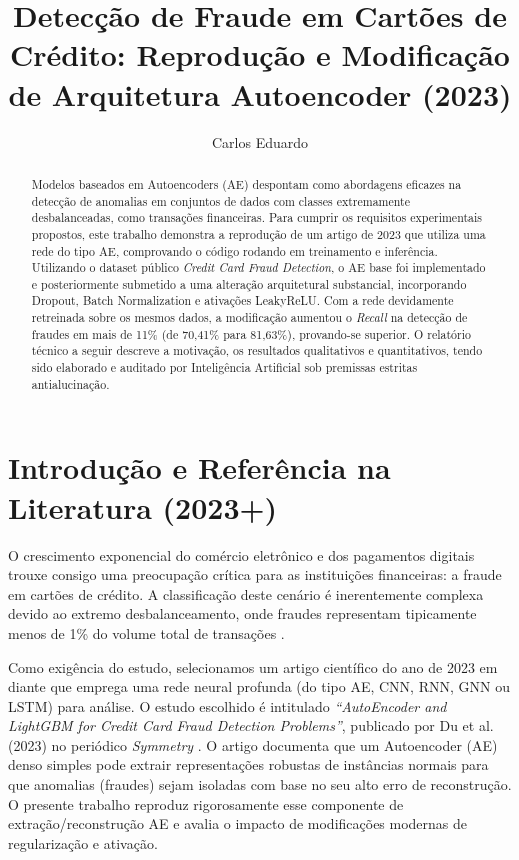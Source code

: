 \documentclass[runningheads]{template_llncs/llncs}
\begin{document}
%
\title{Detecção de Fraude em Cartões de Crédito: Reprodução e Modificação de Arquitetura Autoencoder (2023)}
%
%
\author{Carlos Eduardo}
%
%
%
\maketitle              %
%
\begin{abstract}
Modelos baseados em Autoencoders (AE) despontam como abordagens eficazes na detecção de anomalias em conjuntos de dados com classes extremamente desbalanceadas, como transações financeiras. Para cumprir os requisitos experimentais propostos, este trabalho demonstra a reprodução de um artigo de 2023 que utiliza uma rede do tipo AE, comprovando o código rodando em treinamento e inferência. Utilizando o dataset público \emph{Credit Card Fraud Detection}, o AE base foi implementado e posteriormente submetido a uma alteração arquitetural substancial, incorporando Dropout, Batch Normalization e ativações LeakyReLU. Com a rede devidamente retreinada sobre os mesmos dados, a modificação aumentou o \emph{Recall} na detecção de fraudes em mais de 11\% (de 70,41\% para 81,63\%), provando-se superior. O relatório técnico a seguir descreve a motivação, os resultados qualitativos e quantitativos, tendo sido elaborado e auditado por Inteligência Artificial sob premissas estritas antialucinação.

\end{abstract}
%

\section{Introdução e Referência na Literatura (2023+)}
O crescimento exponencial do comércio eletrônico e dos pagamentos digitais trouxe consigo uma preocupação crítica para as instituições financeiras: a fraude em cartões de crédito. A classificação deste cenário é inerentemente complexa devido ao extremo desbalanceamento, onde fraudes representam tipicamente menos de 1\% do volume total de transações \cite{du2023}. 

Como exigência do estudo, selecionamos um artigo científico do ano de 2023 em diante que emprega uma rede neural profunda (do tipo AE, CNN, RNN, GNN ou LSTM) para análise. O estudo escolhido é intitulado \emph{``AutoEncoder and LightGBM for Credit Card Fraud Detection Problems''}, publicado por Du et al. (2023) no periódico \emph{Symmetry} \cite{du2023}. O artigo documenta que um Autoencoder (AE) denso simples pode extrair representações robustas de instâncias normais para que anomalias (fraudes) sejam isoladas com base no seu alto erro de reconstrução. O presente trabalho reproduz rigorosamente esse componente de extração/reconstrução AE e avalia o impacto de modificações modernas de regularização e ativação.
\end{document}
